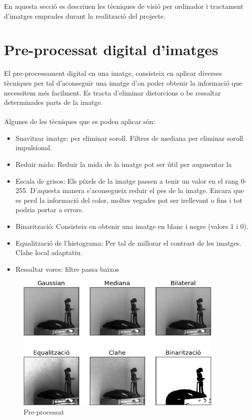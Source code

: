 En aquesta secció es descriuen les tècniques de visió per ordinador i tractament d'imatges emprades durant la realització del projecte.

\section{Pre-processat digital d'imatges}
	El pre-processament digital en una imatge, consisteix en aplicar diverses tècniques per tal d'aconseguir una imatge d'on poder obtenir la informació que necessitem més facilment. Es tracta
	d'eliminar distorcions o be ressaltar determinades parts de la imatge.\\\\
	Algunes de les tècniques que es poden aplicar són:

	\begin{itemize}	
		\item{Suavitzar imatge: per eliminar soroll. Filtres de mediana per eliminar soroll impulsional.}
		\item{Reduir mida: Reduir la mida de la imatge pot ser útil per augmentar la}
		\item{Escala de grisos: Els píxels de la imatge passen a tenir un valor en el rang 0-255. D'aquesta manera s'aconsegueix reduir el pes de la imatge. Encara que es perd la informació del color, moltes
		vegades pot ser irellevant o fins i tot podria portar a errors.}
		\item{Binarització: Consisteix en obtenir una imatge en blanc i negre (valors 1 i 0).}
		\item{Equalització de l'histograma: Per tal de millorar el contrast de les imatges. Clahe local adaptatiu.}
		\item{Ressaltar vores: filtre passa baixos}
	\end{itemize}
	
	\begin{figure}[H]
		\centering
		\includegraphics[width=0.9\textwidth]{images/pre-processat}
		\caption{Pre-processat}
	\end{figure}


